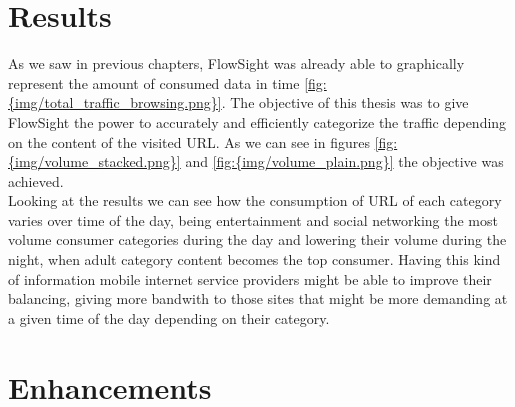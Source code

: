 

\section{Results}

As we saw in previous chapters, FlowSight was already able to graphically represent the amount of consumed data in time \ref{fig:{img/total_traffic_browsing.png}}. The objective of this thesis was to
give FlowSight the power to accurately and efficiently categorize the traffic depending on the content of the visited URL. As we can see in figures \ref{fig:{img/volume_stacked.png}} and 
\ref{fig:{img/volume_plain.png}} the objective was achieved.\\
Looking at the results we can see how the consumption of URL of each category varies over time of the day, being entertainment and social networking the most volume consumer categories during the day and lowering their volume during the night, when adult category content becomes the top consumer.
Having this kind of information mobile internet service providers might be able to improve their balancing, giving more bandwith to those sites that might be more demanding at a given time of the day depending on their category. 
\clearpage
{}




\section{Enhancements}

